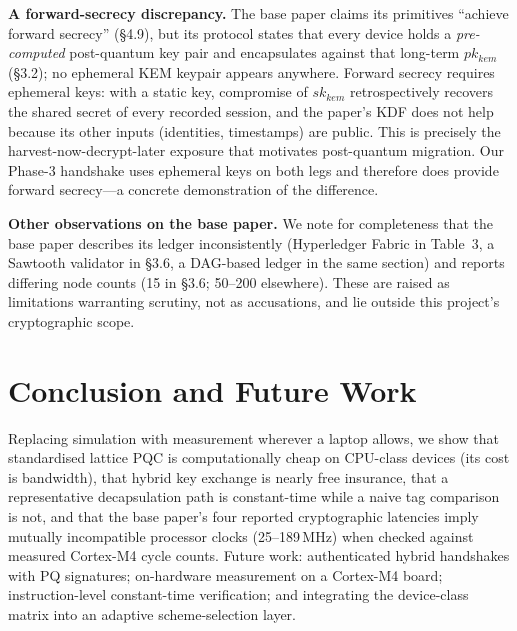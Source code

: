 \documentclass[conference]{IEEEtran}
\begin{document}
\textbf{A forward-secrecy discrepancy.} The base paper claims its primitives
``achieve forward secrecy'' (\S4.9), but its protocol states that every device
holds a \emph{pre-computed} post-quantum key pair and encapsulates against that
long-term $pk_{kem}$ (\S3.2); no ephemeral KEM keypair appears anywhere. Forward
secrecy requires ephemeral keys: with a static key, compromise of $sk_{kem}$
retrospectively recovers the shared secret of every recorded session, and the
paper's KDF does not help because its other inputs (identities, timestamps) are
public. This is precisely the harvest-now-decrypt-later exposure that motivates
post-quantum migration. Our Phase-3 handshake uses ephemeral keys on both legs
and therefore does provide forward secrecy---a concrete demonstration of the
difference.

\textbf{Other observations on the base paper.} We note for
completeness that the base paper describes its ledger inconsistently
(Hyperledger Fabric in Table~3, a Sawtooth validator in \S3.6, a DAG-based
ledger in the same section) and reports differing node counts (15 in \S3.6;
50--200 elsewhere). These are raised as limitations warranting scrutiny, not
as accusations, and lie outside this project's cryptographic scope.

\section{Conclusion and Future Work}
Replacing simulation with measurement wherever a laptop allows, we show that
standardised lattice PQC is computationally cheap on CPU-class devices (its
cost is bandwidth), that hybrid key exchange is nearly free insurance, that a
representative decapsulation path is constant-time while a naive tag comparison
is not, and that the base paper's four reported cryptographic latencies imply
mutually incompatible processor clocks (25--189\,MHz) when checked against
measured Cortex-M4 cycle counts. Future work:
authenticated hybrid handshakes with PQ signatures; on-hardware measurement on
a Cortex-M4 board; instruction-level constant-time verification; and integrating
the device-class matrix into an adaptive scheme-selection layer.



\end{document}
